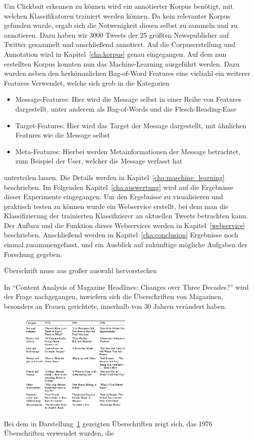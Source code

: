 Um Clickbait erkennen zu können wird ein annotierter Korpus benötigt, mit welchen Klassifikatoren trainiert werden können. Da kein relevanter Korpus gefunden wurde, ergab sich die Notwenigkeit diesen selbst zu sammeln und zu annotieren.
Dazu haben wir 3000 Tweets der 25 größten  Newspublisher  auf Twitter gesammelt und anschließend annotiert. Auf die Corpuserstellung und Annotation wird in Kapitel~\ref{cha:korpus} genau eingegangen.
Auf dem nun erstellten Korpus konnten nun das Machine-Learning ausgeführt werden. Dazu wurden neben den herkömmlichen Bag-of-Word Features eine vielzahl ein weiterer Features Verwendet, welche sich grob in die Kategorien
\begin{itemize}
  \item Message-Features: Hier wird die Message selbst in einer Reihe von Features dargestellt, unter anderem als Bag-of-Words und die Flesch-Reading-Ease
  \item Target-Features: Hier wird das Target der Message dargestellt, mit ähnlichen Features wie die Message selbst
  \item Meta-Features: Hierbei werden Metainformationen der Message betrachtet, zum Beispiel der User, welcher die Message verfasst hat
\end{itemize}
unterteilen lassen. Die Details werden in Kapitel~\ref{cha:maschine_learning} beschrieben.
Im Folgenden Kapitel~\ref{cha:auswertung} wird auf die Ergebnisse dieser Experimente eingegangen.
Um den Ergebnisse zu visualisieren und praktisch testen zu können wurde ein Webservice erstellt, bei dem man die Klassifizierung der trainierten Klassifizierer an aktuellen Tweets betrachten kann. Der Aufbau und die Funktion dieses Webservices werden in Kapitel~\ref{webservice} beschrieben.
Anschließend werden in Kapitel~\ref{cha:conclusion} Ergebnisse noch einmal zusammengefasst, und ein Ausblick auf zukünftige mögliche Aufgaben der Forschung gegeben.



Überschrift muss aus großer auswahl hervorstechen


In \enquote{Content Analysis of Magazine Headlines: Changes over Three Decades?} \cite{davalos2007iii} wird der Frage nachgegangen, inwiefern sich die Überschriften von Magazinen, besonders an Frauen gerichtete, innerhalb von 30 Jahren verändert haben.
\begin{figure}
\label{tab:womenclickbait}
\includegraphics[width=0.5\textwidth]{../images/women-magazine-clickbait}
\end{figure}
Bei dem in Darstellung~\ref{tab:womenclickbait} gezeigten Überschriften zeigt sich, das
1976 Überschriften verwendet wurden, die 


